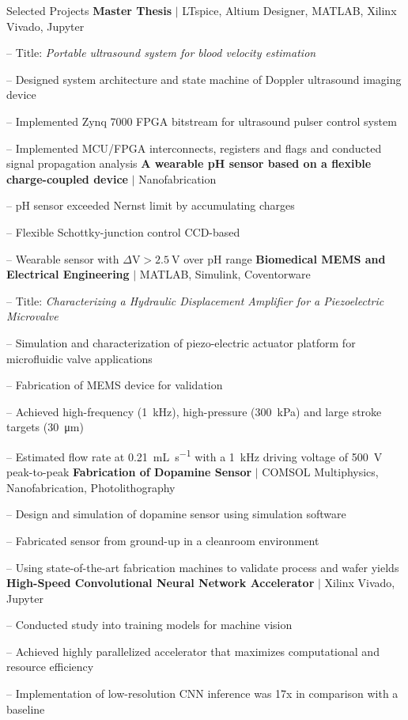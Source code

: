 
\begin{rubric}{\faTasks[solid]  Selected Projects}
\entry*[2023][]%
	\textbf{Master Thesis} $|$ LTspice, Altium Designer, MATLAB, Xilinx Vivado, Jupyter \par
	-- Title: \emph{Portable ultrasound system for blood velocity estimation} \par
	-- Designed system architecture and state machine of Doppler ultrasound imaging device \par
	-- Implemented Zynq 7000 FPGA bitstream for ultrasound pulser control system \par
	-- Implemented MCU/FPGA interconnects, registers and flags and conducted signal propagation analysis
%
\entry*[2023][] \textbf{A wearable pH sensor based on a flexible charge-coupled device} $|$ Nanofabrication \par
	-- pH sensor exceeded Nernst limit by accumulating charges \par
	-- Flexible Schottky-junction control CCD-based \par
	-- Wearable sensor with $\Delta \si{\volt}>\SI{2.5}{\volt}$ over pH range
%
\entry*[2022][] \textbf{Biomedical MEMS and Electrical Engineering} $|$ MATLAB, Simulink, Coventorware \par
	-- Title: \emph{Characterizing a Hydraulic Displacement Amplifier for a Piezoelectric Microvalve} \par
	-- Simulation and characterization of piezo-electric actuator platform for microfluidic valve applications \par
	-- Fabrication of MEMS device for validation \par
	-- Achieved high-frequency (\SI{1}{\kilo\hertz}), high-pressure (\SI{300}{\kilo\pascal}) and large stroke targets (\SI{30}{\micro\meter}) \par
	-- Estimated flow rate at \SI{0.21}{\milli\liter\per\second} with a \SI{1}{\kilo\hertz} driving voltage of \SI{500}{\volt} peak-to-peak
%
\entry*[2021][] \textbf{Fabrication of Dopamine Sensor} $|$ COMSOL Multiphysics, Nanofabrication, Photolithography \par
	-- Design and simulation of dopamine sensor using simulation software \par
	-- Fabricated sensor from ground-up in a cleanroom environment \par
	-- Using state-of-the-art fabrication machines to validate process and wafer yields
%
\entry*[2020][] \textbf{High-Speed Convolutional Neural Network Accelerator} $|$ Xilinx Vivado, Jupyter \par
	-- Conducted study into training models for machine vision \par
	-- Achieved highly parallelized accelerator that maximizes computational and resource efficiency \par
	-- Implementation of low-resolution CNN inference was 17x in comparison with a baseline
\end{rubric}
